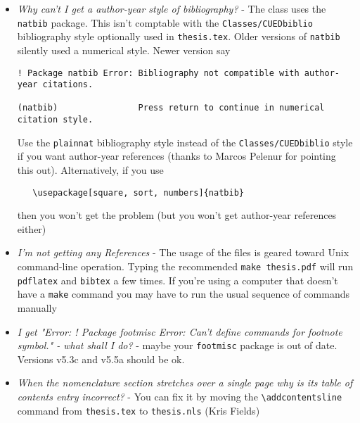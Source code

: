 \documentclass{article}
\begin{document}
\begin{itemize}
\begin{verbatim}
   \chapter*{Preface\markboth{Preface}{}}
\end{verbatim}
      Entering the \verb|\markboth| command inside the \verb|\chapter*| insures that the mark will not be separated from the title by a page break.
\item \textit{Why can't I get a author-year style of bibliography?} - The class
uses the \texttt{natbib} package. This isn't comptable with the
\texttt{Classes/CUEDbiblio} bibliography style optionally used in
\texttt{thesis.tex}. Older versions of  \texttt{natbib} silently used a
numerical style. Newer version say
\begin{verbatim}
! Package natbib Error: Bibliography not compatible with author-year citations.

(natbib)                Press return to continue in numerical citation style.
\end{verbatim}
Use the \texttt{plainnat} bibliography style instead of the
\texttt{Classes/CUEDbiblio} style if you want author-year references (thanks to
Marcos Pelenur for pointing this out).
Alternatively, if you use
\begin{verbatim}
   \usepackage[square, sort, numbers]{natbib}
\end{verbatim}
then you won't get the problem (but you won't get author-year references either)
\item  \textit{I'm not getting any References} - The usage of the files is geared
toward Unix command-line operation. Typing the recommended \texttt{make
thesis.pdf} will run \texttt{pdflatex} and \texttt{bibtex} a few times. If
you're using a computer that doesn't have a \texttt{make} command you may have
to run the usual sequence of commands manually

\item  \textit{I get "Error: ! Package footmisc Error: Can't define commands for
footnote symbol." - what shall I do?} - maybe your \texttt{footmisc} package is out of date. Versions v5.3c and
v5.5a should be ok.
 
\item  \textit{When the nomenclature section stretches over a
single page why is its table of contents entry incorrect?} - You can fix it
by moving the \verb|\addcontentsline| command from \texttt{thesis.tex} to \texttt{thesis.nls} (Kris Fields)
\end{itemize}
\end{document}
